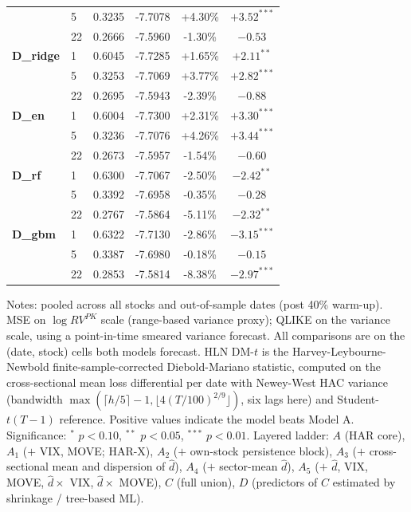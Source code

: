 \begin{table}[htbp]
\begin{tabular}{llcccc}
 &  5 & 0.3235 & -7.7078 & +4.30\% & $+3.52^{***}$ \\
 & 22 & 0.2666 & -7.5960 & -1.30\% & $-0.53$ \\
\midrule
\textbf{D\_ridge} &  1 & 0.6045 & -7.7285 & +1.65\% & $+2.11^{**}$ \\
 &  5 & 0.3253 & -7.7069 & +3.77\% & $+2.82^{***}$ \\
 & 22 & 0.2695 & -7.5943 & -2.39\% & $-0.88$ \\
\midrule
\textbf{D\_en} &  1 & 0.6004 & -7.7300 & +2.31\% & $+3.30^{***}$ \\
 &  5 & 0.3236 & -7.7076 & +4.26\% & $+3.44^{***}$ \\
 & 22 & 0.2673 & -7.5957 & -1.54\% & $-0.60$ \\
\midrule
\textbf{D\_rf} &  1 & 0.6300 & -7.7067 & -2.50\% & $-2.42^{**}$ \\
 &  5 & 0.3392 & -7.6958 & -0.35\% & $-0.28$ \\
 & 22 & 0.2767 & -7.5864 & -5.11\% & $-2.32^{**}$ \\
\midrule
\textbf{D\_gbm} &  1 & 0.6322 & -7.7130 & -2.86\% & $-3.15^{***}$ \\
 &  5 & 0.3387 & -7.6980 & -0.18\% & $-0.15$ \\
 & 22 & 0.2853 & -7.5814 & -8.38\% & $-2.97^{***}$ \\
\bottomrule
\end{tabular}
\begin{tablenotes}\small
\item Notes: pooled across all stocks and out-of-sample dates (post 40\% warm-up). MSE on $\log RV^{PK}$ scale (range-based variance proxy); QLIKE on the variance scale, using a point-in-time smeared variance forecast. All comparisons are on the (date, stock) cells both models forecast. HLN DM-$t$ is the Harvey-Leybourne-Newbold finite-sample-corrected Diebold-Mariano statistic, computed on the cross-sectional mean loss differential per date with Newey-West HAC variance (bandwidth $\max(\lceil h/5 \rceil - 1, \lfloor 4 (T/100)^{2/9} \rfloor)$, six lags here) and Student-$t(T-1)$ reference. Positive values indicate the model beats Model A. Significance: $^{*}$ $p<0.10$, $^{**}$ $p<0.05$, $^{***}$ $p<0.01$. Layered ladder: $A$ (HAR core), $A_1$ ($+$ VIX, MOVE; HAR-X), $A_2$ ($+$ own-stock persistence block), $A_3$ ($+$ cross-sectional mean and dispersion of $\hat d$), $A_4$ ($+$ sector-mean $\hat d$), $A_5$ ($+$ $\hat d$, VIX, MOVE, $\hat d \times$ VIX, $\hat d \times$ MOVE), $C$ (full union), $D$ (predictors of $C$ estimated by shrinkage / tree-based ML).
\end{tablenotes}
\end{table}
